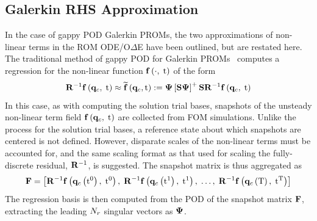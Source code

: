 \subsection{Galerkin RHS Approximation}
%
In the case of gappy POD Galerkin PROMs, the two approximations of non-linear terms in the ROM ODE/O$\Delta$E have been outlined, but are restated here. The traditional method of gappy POD for Galerkin PROMs~\cite{Chaturantabut2010} computes a regression for the non-linear function $\mathbf{f} \left(\cdot, \; \text{t}\right)$ of the form
%
\begin{equation}
	\resScaleInv \rhsFunc{\consVec, \; \timeVar} \approx \rhsApproxFunc{\consVec, \timeVar} \defEq \deimBasis \left[\sampMat \deimBasis \right]^+ \sampMat \resScaleInv \rhsFunc{\consVec, \; \timeVar}
\end{equation}
%
In this case, as with computing the solution trial bases, snapshots of the unsteady non-linear term field $\mathbf{f} \left(\mathbf{q}_{c}, \; \text{t}\right)$ are collected from FOM simulations. Unlike the process for the solution trial bases, a reference state about which snapshots are centered is not defined. However, disparate scales of the non-linear terms must be accounted for, and the same scaling format as that used for scaling the fully-discrete residual, $\resScaleInv$, is suggested. The snapshot matrix is thus aggregated as
%
\begin{equation}
	\rhsDataMat = \left[ \resScaleInv \rhsFunc{\consFunc{\timeVar^0}, \; \timeVar^0}, \; \resScaleInv \rhsFunc{\consFunc{\timeVar^1}, \; \timeVar^1}, \; \hdots, \; \resScaleInv \rhsFunc{\consFunc{\finalTime}, \; \timeVar^{\finalTime}} \right]
\end{equation}
%
The regression basis is then computed from the POD of the snapshot matrix $\rhsDataMat$, extracting the leading $N_r$ singular vectors as $\deimBasis$.

